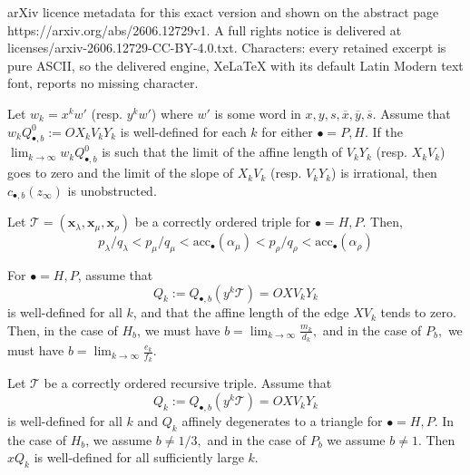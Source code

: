 \documentclass[10pt,a4paper]{amsart}
\newcommand{\Tt}{\mathcal{T}}
\newcommand{\acc}{\mathrm{acc}}
\newcommand{\al}{{\alpha}}
\newcommand{\la}{{\lambda}}
\newcommand{\ov}{\overline}
\begin{document}
arXiv licence metadata for this exact version and shown on the abstract page https://arxiv.org/abs/2606.12729v1. A full rights notice is delivered at licenses/arxiv-2606.12729-CC-BY-4.0.txt. Characters: every retained excerpt is pure ASCII, so the delivered engine, XeLaTeX with its default Latin Modern text font, reports no missing character.
\begin{lemma} \label{lem:fullFillingAccPt}
   Let $w_k=x^kw'$ (resp. $y^kw'$) where $w'$ is some word in $x,y,s,\ov{x},\ov{y},\ov{s}.$  Assume that $w_kQ_{\bullet,b}^{0}:=OX_kV_kY_k$ is well-defined for each $k$ for either $\bullet=P,H$. If the $\lim_{k \to \infty} w_kQ_{\bullet,b}^{0}$ is such that the limit of the affine length of $V_kY_k$ (resp. $X_kV_k$) goes to zero and 
   the limit of the slope of $X_kV_k$ (resp. $V_kY_k$) is irrational, then $c_{\bullet,b}(z_\infty)$ is unobstructed. 
\end{lemma}

\begin{lemma} \label{lem:pqAlOrder2}
    Let $\Tt=(\bm{x}_\la,\bm{x}_\mu,\bm{x}_\rho)$ be a correctly ordered triple for $\bullet=H,P$. Then, 
    \[ p_\la/q_\la<p_\mu/q_\mu<\acc_\bullet(\al_\mu)<p_\rho/q_\rho<\acc_\bullet(\al_\rho)\]
\end{lemma}

\begin{lemma}\label{lem:affineDegenerationLimitH}
 For $\bullet=H,P$, assume that
\[
        Q_k:=Q_{\bullet,b}(y^k\Tt)=OXV_kY_k
\]
is well-defined for all $k$, and that the affine length of the edge
$XV_k$ tends to zero. Then, in the case of $H_b$, we must have $b=\lim_{k \to \infty} \frac{m_k}{d_k},$ and in the case of $P_b,$ we must have $b=\lim_{k \to \infty} \frac{e_k}{f_k}$. 
\end{lemma}

\begin{lemma}\label{lem:yTailXVisible}
Let $\Tt$ be a correctly ordered recursive triple. 
Assume that
\[
        Q_k:=Q_{\bullet,b}(y^k\Tt)=OXV_kY_k
\]
is well-defined for all $k$ and $Q_k$ affinely degenerates to a triangle for $\bullet=H,P$. In the case of $H_b$, we assume $b \neq 1/3,$ and in the case of $P_b$ we assume $b \neq 1.$ Then $xQ_k$ is well-defined for all sufficiently large $k$.

\end{lemma}
\end{document}
